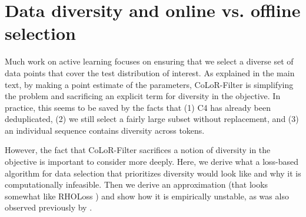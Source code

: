 \documentclass{article}
\begin{document}
\begin{table}[h]
    \caption{Final performance for all tasks for 1.2b models. Note that the CoLoR-Filter models do not train on as many tokens since we exhaust all of the tokens in C4 with these settings of $ \tau$.}
    \label{tab:1b-down}
    \centering
\end{table}




\section{Data diversity and online vs. offline selection}\label{app:online}

Much work on active learning focuses on ensuring that we select a diverse set of data points that cover the test distribution of interest. As explained in the main text, by making a point estimate of the parameters, CoLoR-Filter is simplifying the problem and sacrificing an explicit term for diversity in the objective. In practice, this seems to be saved by the facts that (1) C4 has already been deduplicated, (2) we still select a fairly large subset without replacement, and (3) an individual sequence contains diversity across tokens.

However, the fact that CoLoR-Filter sacrifices a notion of diversity in the objective is important to consider more deeply. 
Here, we derive what a loss-based algorithm for data selection that prioritizes diversity would look like and why it is computationally infeasible. 
Then we derive an approximation (that looks somewhat like RHOLoss \citep{mindermann2022prioritized}) and show how it is empirically unstable, as was also observed previously by \citep{mindermann2022prioritized}.
\end{document}
